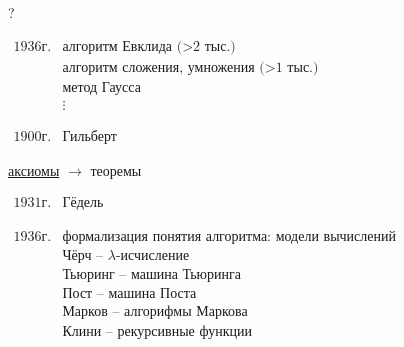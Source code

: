 
\begin{note}[История]
    ?

    $ \begin{array}{ll}
            \boxed{1936\text{г.}} & \text{алгоритм Евклида (>2 тыс.)}             \\
                                  & \text{алгоритм сложения, умножения (>1 тыс.)} \\
                                  & \text{метод Гаусса}                           \\
                                  & \vdots
        \end{array} $

    $ \begin{array}{ll}
            \boxed{1900\text{г.}} & \text{Гильберт}
        \end{array} $

    \begin{center}
        \underline{аксиомы} $ \longrightarrow $ теоремы
    \end{center}

    $ \begin{array}{ll}
            \boxed{1931\text{г.}} & \text{Гёдель}
        \end{array} $

    $ \begin{array}{ll}
            \boxed{1936\text{г.}} & \text{формализация понятия алгоритма: модели вычислений} \\
                                  & \text{Чёрч -- }\lambda\text{-исчисление}                 \\
                                  & \text{Тьюринг -- машина Тьюринга}                        \\
                                  & \text{Пост -- машина Поста}                              \\
                                  & \text{Марков -- алгорифмы Маркова}                       \\
                                  & \text{Клини -- рекурсивные функции}
        \end{array} $


\end{note}
